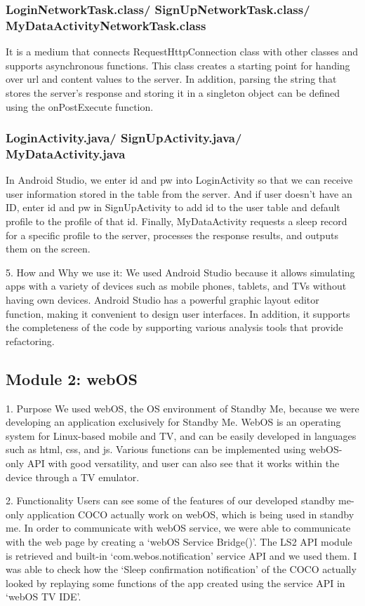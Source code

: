\documentclass[conference]{IEEEtran}
\begin{document}
\subsubsection{LoginNetworkTask.class/ SignUpNetworkTask.class/ MyDataActivityNetworkTask.class}
It is a medium that connects RequestHttpConnection class with other classes and supports asynchronous functions. This class creates a starting point for handing over url and content values to the server. In addition, parsing the string that stores the server's response and storing it in a singleton object can be defined using the onPostExecute function.\break
\subsubsection{LoginActivity.java/ SignUpActivity.java/ MyDataActivity.java}
In Android Studio, we enter id and pw into LoginActivity so that we can receive user information stored in the table from the server. And if user doesn't have an ID, enter id and pw in SignUpActivity to add id to the user table and default profile to the profile of that id. Finally, MyDataActivity requests a sleep record for a specific profile to the server, processes the response results, and outputs them on the screen.\break
\par 5. How and Why we use it: We used Android Studio because it allows simulating apps with a variety of devices such as mobile phones, tablets, and TVs without having own devices. Android Studio has a powerful graphic layout editor function, making it convenient to design user interfaces. In addition, it supports the completeness of the code by supporting various analysis tools that provide refactoring.
\break

\subsection{Module 2: webOS}
1. Purpose
We used webOS, the OS environment of Standby Me, because we were developing an application exclusively for Standby Me. WebOS is an operating system for Linux-based mobile and TV, and can be easily developed in languages such as html, css, and js. Various functions can be implemented using webOS-only API with good versatility, and user can also see that it works within the device through a TV emulator.\break

\par2. Functionality
Users can see some of the features of our developed standby me-only application COCO actually work on webOS, which is being used in standby me. In order to communicate with webOS service, we were able to communicate with the web page by creating a ‘webOS Service Bridge()'. The LS2 API module is retrieved and built-in ‘com.webos.notification' service API and we used them. I was able to check how the ‘Sleep confirmation notification' of the COCO actually looked by replaying some functions of the app created using the service API in ‘webOS TV IDE'.\break
\end{document}
